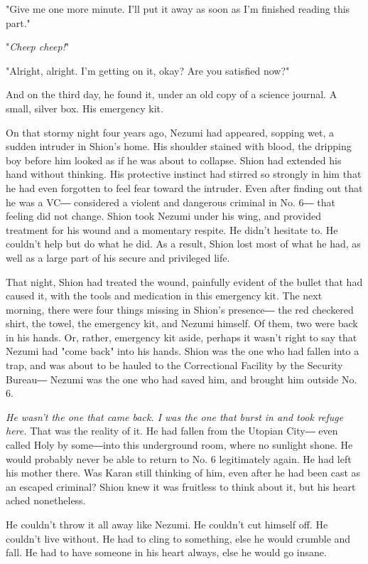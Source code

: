 "Give me one more minute. I'll put it away as soon as I'm finished
reading this part."

"\emph{Cheep cheep!}"

"Alright, alright. I'm getting on it, okay? Are you satisfied now?"

And on the third day, he found it, under an old copy of a science
journal. A small, silver box. His emergency kit.

On that stormy night four years ago, Nezumi had appeared, sopping wet, a
sudden intruder in Shion's home. His shoulder stained with blood, the
dripping boy before him looked as if he was about to collapse. Shion had
extended his hand without thinking. His protective instinct had stirred
so strongly in him that he had even forgotten to feel fear toward the
intruder. Even after finding out that he was a VC― considered a violent
and dangerous criminal in No. 6― that feeling did not change. Shion took
Nezumi under his wing, and provided treatment for his wound and a
momentary respite. He didn't hesitate to. He couldn't help but do what
he did. As a result, Shion lost most of what he had, as well as a large
part of his secure and privileged life.

That night, Shion had treated the wound, painfully evident of the bullet
that had caused it, with the tools and medication in this emergency kit.
The next morning, there were four things missing in Shion's presence―
the red checkered shirt, the towel, the emergency kit, and Nezumi
himself. Of them, two were back in his hands. Or, rather, emergency kit
aside, perhaps it wasn't right to say that Nezumi had "come back" into
his hands. Shion was the one who had fallen into a trap, and was about
to be hauled to the Correctional Facility by the Security Bureau― Nezumi
was the one who had saved him, and brought him outside No. 6.

\emph{He wasn't the one that came back. I was the one that burst in and took
refuge here.} That was the reality of it. He had fallen from the Utopian
City― even called Holy by some―into this underground room, where no
sunlight shone. He would probably never be able to return to No. 6
legitimately again. He had left his mother there. Was Karan still
thinking of him, even after he had been cast as an escaped criminal?
Shion knew it was fruitless to think about it, but his heart ached
nonetheless.

He couldn't throw it all away like Nezumi. He couldn't cut himself off.
He couldn't live without. He had to cling to something, else he would
crumble and fall. He had to have someone in his heart always, else he
would go insane.

